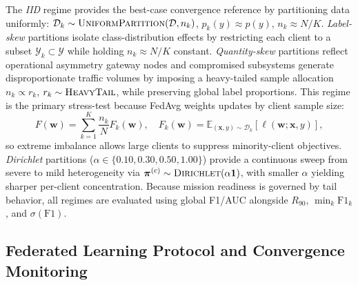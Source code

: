 \documentclass[conference]{IEEEtran}
\begin{document}
The \textit{IID} regime provides the best-case convergence
reference by partitioning data uniformly:
$\mathcal{D}_k\sim\textsc{UniformPartition}(\mathcal{D},n_k)$,
$p_k(y)\approx p(y)$, $n_k\approx N/K$.
\textit{Label-skew} partitions isolate class-distribution effects
by restricting each client to a subset
$\mathcal{Y}_k\subset\mathcal{Y}$ while holding $n_k\approx N/K$
constant. \textit{Quantity-skew} partitions reflect operational
asymmetry gateway nodes and compromised subsystems generate
disproportionate traffic volumes by imposing a heavy-tailed
sample allocation $n_k\propto r_k$, $r_k\sim\textsc{HeavyTail}$,
while preserving global label proportions. This regime is the
primary stress-test because FedAvg weights updates by client
sample size:
\begin{equation}
F(\mathbf{w})=\sum_{k=1}^{K}\frac{n_k}{N}F_k(\mathbf{w}),\quad
F_k(\mathbf{w})=\mathbb{E}_{(\mathbf{x},y)\sim\mathcal{D}_k}
[\ell(\mathbf{w};\mathbf{x},y)],
\label{eq:fedavg_weighted_obj}
\end{equation}
so extreme imbalance allows large clients to suppress
minority-client objectives. \textit{Dirichlet} partitions
($\alpha\in\{0.10,0.30,0.50,1.00\}$) provide a continuous
sweep from severe to mild heterogeneity via
$\boldsymbol{\pi}^{(c)}\sim\textsc{Dirichlet}(\alpha\mathbf{1})$,
with smaller $\alpha$ yielding sharper per-client concentration.
Because mission readiness is governed by tail behavior, all
regimes are evaluated using global F1/AUC alongside
$R_{90}$, $\min_k\mathrm{F1}_k$, and $\sigma(\mathrm{F1})$.

\subsection{Federated Learning Protocol and Convergence
            Monitoring}
\label{subsec:federated_protocol_convergence}
\end{document}
